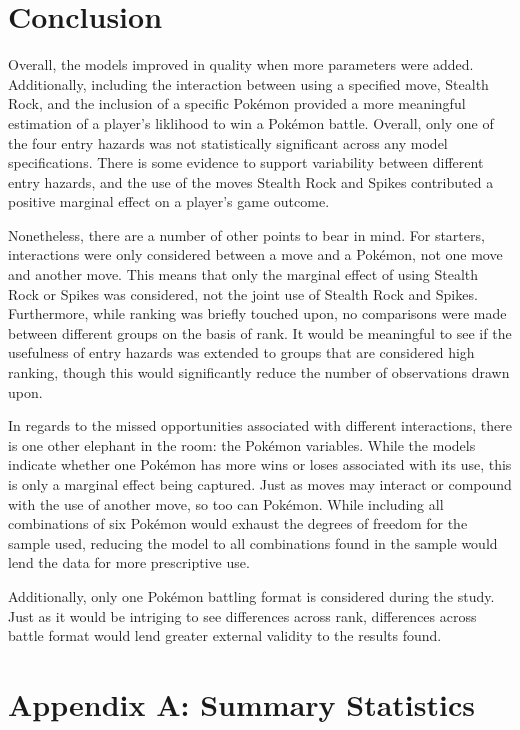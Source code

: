 \documentclass[12pt,twoside]{reedthesis}
\begin{document}
  \chapter{Conclusion}\label{conclusion}
  
  Overall, the models improved in quality when more parameters were added.
  Additionally, including the interaction between using a specified move,
  Stealth Rock, and the inclusion of a specific Pokémon provided a more
  meaningful estimation of a player's liklihood to win a Pokémon battle.
  Overall, only one of the four entry hazards was not statistically
  significant across any model specifications. There is some evidence to
  support variability between different entry hazards, and the use of the
  moves Stealth Rock and Spikes contributed a positive marginal effect on
  a player's game outcome.
  
  Nonetheless, there are a number of other points to bear in mind. For
  starters, interactions were only considered between a move and a
  Pokémon, not one move and another move. This means that only the
  marginal effect of using Stealth Rock or Spikes was considered, not the
  joint use of Stealth Rock and Spikes. Furthermore, while ranking was
  briefly touched upon, no comparisons were made between different groups
  on the basis of rank. It would be meaningful to see if the usefulness of
  entry hazards was extended to groups that are considered high ranking,
  though this would significantly reduce the number of observations drawn
  upon.
  
  In regards to the missed opportunities associated with different
  interactions, there is one other elephant in the room: the Pokémon
  variables. While the models indicate whether one Pokémon has more wins
  or loses associated with its use, this is only a marginal effect being
  captured. Just as moves may interact or compound with the use of another
  move, so too can Pokémon. While including all combinations of six
  Pokémon would exhaust the degrees of freedom for the sample used,
  reducing the model to all combinations found in the sample would lend
  the data for more prescriptive use.
  
  Additionally, only one Pokémon battling format is considered during the
  study. Just as it would be intriging to see differences across rank,
  differences across battle format would lend greater external validity to
  the results found.
  
  \appendix
  
  \chapter{Appendix A: Summary
  Statistics}\label{appendix-a-summary-statistics}
  
\end{document}
